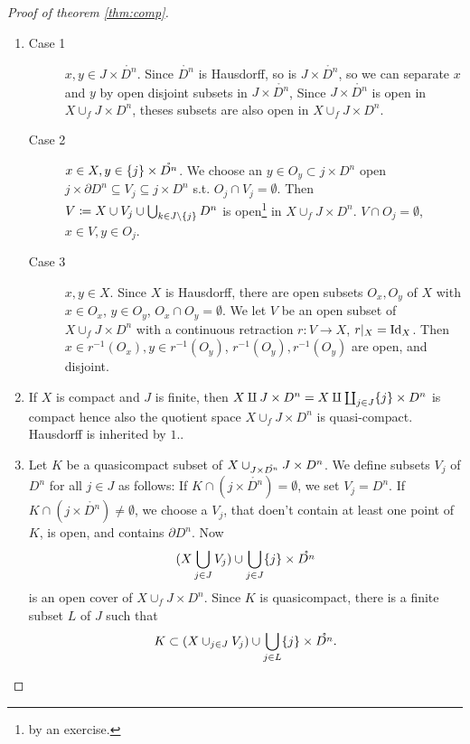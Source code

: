 \documentclass{TemplateLecture}
\begin{document}
\begin{proof}[Proof of theorem \ref{thm:comp}]\leavevmode
    \begin{enumerate}
        \item \begin{description}
            \item[Case 1] \(x,y \in J\times \mathring{D^n}\). Since \(\mathring{D^n}\) is Hausdorff, so is \(J\times \mathring{D^n}\), so we can separate \(x\) and \(y\) by open disjoint subsets in \(J\times \mathring{D^n}\), Since \(J\times \mathring{D^n}\) is open in \(X \cup_f J\times D^n\), theses subsets are also open in \(X\cup_f J\times D^n\).
            \item[Case 2] \(x\in X, y \in \{j\} \times \mathring{D^n}\). We choose an \(y \in O_y \subset j \times D^n\) open \(j \times \partial D^n \subseteq V_j \subseteq j\times D^n\) s.t. \(O_j \cap V_j = \emptyset\).
            Then \(V\coloneq X\cup V_j \cup \bigcup_{k \in J\setminus\{j\}} D^n\) is open\footnote{by an exercise.} in \(X \cup_f J \times D^n\). \(V \cap O_j = \emptyset\), \(x \in V, y \in O_j\).
            \item[Case 3] \(x,y \in X\). Since \(X\) is Hausdorff, there are open subsets \(O_x, O_y\) of \(X\) with \(x \in O_x\), \(y \in O_y\), \(O_x \cap O_y = \emptyset\).
            We let \(V\) be an open subset of \(X \cup_f J \times D^n\) with a continuous retraction \(r\colon V\to X\), \(r\rvert_X = \mathrm{Id}_X\). Then \(x \in r^{-1}(O_x), y \in r^{-1}(O_y)\), \(r^{-1}(O_y), r^{-1}(O_y)\) are open, and disjoint.
        \end{description}
        \item If \(X\) is compact and \(J\) is finite, then \(X\amalg J\times D^n = X \amalg \coprod_{j \in J} \{j\} \times D^n\) is compact hence also the quotient space \(X \cup_f J\times D^n\) is quasi-compact. Hausdorff is inherited by \(1.\).
        \item Let \(K\) be a quasicompact subset of \(X \cup_{J\times \mathring{D^n}} J\times D^n\). We define subsets \(V_j\) of \(D^n\) for all \(j \in J\) as follows: If \(K \cap (j \times \mathring{D^n}) = \emptyset\), we set \(V_j = D^n\). If \(K \cap (j\times \mathring{D^n}) \neq \emptyset\), we choose a \(V_j\), that doen't contain at least one point of \(K\), is open, and contains \(\partial D^n\). Now
        \[(X\bigcup_{j \in J} V_j) \cup \bigcup_{j \in J} \{j\} \times \mathring{D^n}\]
        is an open cover of \(X\cup_f J\times D^n\). Since \(K\) is quasicompact, there is a finite subset \(L\) of \(J\) such that
        \[K \subset (X\cup_{j \in J} V_j) \cup \bigcup_{j \in L} \{j\} \times \mathring{D^n}.\]
    \end{enumerate}
\end{proof}
\end{document}
